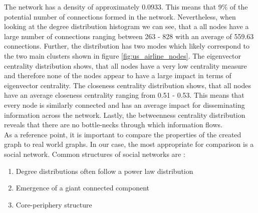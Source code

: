   \noindent The network has a density of approximately 0.0933. This means that 
  9\% of the potential number of connections formed in the network.
  Nevertheless, when looking at the degree distribution histogram we can see, 
  that a all nodes have a large number of connections ranging between 263 -
  828 with an average of 559.63 connections. Further, the distribution has two
  modes which likely correspond to the two main clusters shown in figure
  \ref{fig:us_airline_nodes}. The eigenvector centrality distribution shows, 
  that all nodes have a very low centrality measure and therefore none of the 
  nodes appear to have a large impact in terms of eigenvector centrality. The 
  closeness centrality distribution shows, that all nodes have an average 
  closeness centrality ranging from 0.51 - 0.53. This means that every node is 
  similarly connected and has an average impact for disseminating information 
  across the network. Lastly, the betweenness centrality distribution reveals 
  that there are no bottle-necks through which information flows. \\

  \noindent As a reference point, it is important to compare the properties of
  the created graph to real world graphs. In our case, the most appropriate for
  comparison is a social network. Common structures of social networks are
  \citep{watts1998collective,newman2006structure,Newman2010,
  kim2012multiplicative}:

  \begin{enumerate}
    \item Degree distributions often follow a power law distribution
    \item Emergence of a giant connected component
    \item Core-periphery structure
  \end{enumerate}


